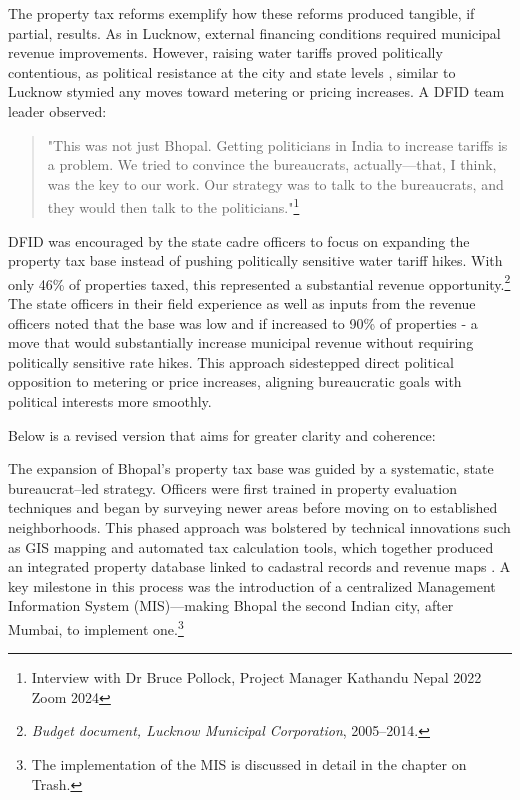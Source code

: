 The property tax reforms exemplify how these reforms produced tangible, if partial, results. As in Lucknow, external financing conditions required municipal revenue improvements. However, raising water tariffs proved politically contentious, as political resistance at the city and state levels , similar to Lucknow stymied any moves toward metering or pricing increases.\citep{sen_issues_2022} A DFID team leader observed:

\begin{quote}
    "This was not just Bhopal. Getting politicians in India to increase tariffs is a problem. We tried to convince the bureaucrats, actually—that, I think, was the key to our work. Our strategy was to talk to the bureaucrats, and they would then talk to the politicians."\footnote{Interview with Dr Bruce Pollock, Project Manager Kathandu Nepal 2022 Zoom 2024}
\end{quote}

DFID was encouraged by the state cadre officers to focus on expanding the property tax base instead of pushing politically sensitive water tariff hikes. With only 46\% of properties taxed, this represented a substantial revenue opportunity.\footnote{\textit{Budget document, Lucknow Municipal Corporation}, 2005–2014.} The state officers in their field experience as well as inputs from the revenue officers noted that the base was low and if increased to 90\% of properties - a move that would substantially increase municipal revenue without requiring politically sensitive rate hikes. This approach sidestepped direct political opposition to metering or price increases, aligning bureaucratic goals with political interests more smoothly.  

Below is a revised version that aims for greater clarity and coherence:

The expansion of Bhopal's property tax base was guided by a systematic, state bureaucrat–led strategy. Officers were first trained in property evaluation techniques and began by surveying newer areas before moving on to established neighborhoods. This phased approach was bolstered by technical innovations such as GIS mapping and automated tax calculation tools, which together produced an integrated property database linked to cadastral records and revenue maps \citep{awasthi_property_2020}. A key milestone in this process was the introduction of a centralized Management Information System (MIS)—making Bhopal the second Indian city, after Mumbai, to implement one.\footnote{The implementation of the MIS is discussed in detail in the chapter on Trash.}

